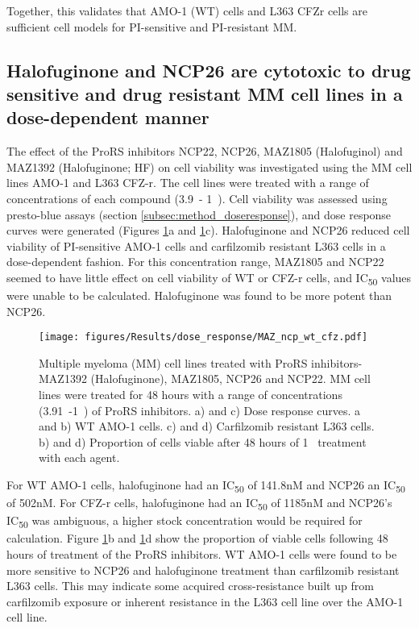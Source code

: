 Together, this validates that AMO-1 (WT) cells and L363 CFZr cells are sufficient cell models for PI-sensitive and PI-resistant MM\@.

\subsection{Halofuginone and NCP26 are cytotoxic to drug sensitive and drug resistant MM cell lines in a dose-dependent manner}
The effect of the ProRS inhibitors NCP22, NCP26, MAZ1805 (Halofuginol) and MAZ1392 (Halofuginone; HF) on cell viability was investigated using the MM cell lines AMO-1 and L363 CFZ-r.
The cell lines were treated with a range of concentrations of each compound (3.9\si{\nano\Molar}- 1\si{\micro\Molar}).
Cell viability was assessed using presto-blue assays (section \ref{subsec:method_doseresponse}), and dose response curves were generated (Figures \ref{fig:dose}a and \ref{fig:dose}c).
Halofuginone and NCP26 reduced cell viability of PI-sensitive AMO-1 cells and carfilzomib resistant L363 cells in a dose-dependent fashion.
For this concentration range, MAZ1805 and NCP22 seemed to have little effect on cell viability of WT or CFZ-r cells, and IC\textsubscript{50} values were unable to be calculated.
Halofuginone was found to be more potent than NCP26.
%
\begin{figure}[h]
\centering
\texttt{[image: figures/Results/dose\_response/MAZ\_ncp\_wt\_cfz.pdf]}
\caption[ProRS inhibitor dose response curves]{Multiple myeloma (MM) cell lines treated with ProRS inhibitors- MAZ1392 (Halofuginone), MAZ1805, NCP26 and NCP22.
MM cell lines were treated for 48 hours with a range of concentrations (3.91\si{\nano\Molar}-1\si{\micro\Molar}) of ProRS inhibitors.
a) and c) Dose response curves.
a and b) WT AMO-1 cells.
c) and d) Carfilzomib resistant L363 cells.
b) and d) Proportion of cells viable after 48 hours of 1\si{\micro\Molar} treatment with each agent.}
\label{fig:dose}
\end{figure}

For WT AMO-1 cells, halofuginone had an IC\textsubscript{50} of 141.8nM and NCP26 an IC\textsubscript{50} of 502nM. For CFZ-r cells, halofuginone had an IC\textsubscript{50} of 1185nM and NCP26's IC\textsubscript{50} was ambiguous, a higher stock concentration would be required for calculation.
Figure \ref{fig:dose}b and \ref{fig:dose}d show the proportion of viable cells following 48 hours of treatment of the ProRS inhibitors.
WT AMO-1 cells were found to be more sensitive to NCP26 and halofuginone treatment than carfilzomib resistant L363 cells.
This may indicate some acquired cross-resistance built up from carfilzomib exposure or inherent resistance in the L363 cell line over the AMO-1 cell line.

